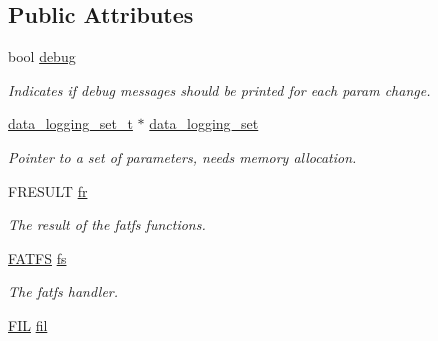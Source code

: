 \subsection*{Public Attributes}
\begin{DoxyCompactItemize}
\item 
\hypertarget{structdata__logging__t_ad68333fc2f6bf82222a007dc234d3634}{bool \hyperlink{structdata__logging__t_ad68333fc2f6bf82222a007dc234d3634}{debug}}\label{structdata__logging__t_ad68333fc2f6bf82222a007dc234d3634}

\begin{DoxyCompactList}\small\item\em Indicates if debug messages should be printed for each param change. \end{DoxyCompactList}\item 
\hypertarget{structdata__logging__t_a794f992659dd70d5a0ad314eba087c24}{\hyperlink{structdata__logging__set__t}{data\+\_\+logging\+\_\+set\+\_\+t} $\ast$ \hyperlink{structdata__logging__t_a794f992659dd70d5a0ad314eba087c24}{data\+\_\+logging\+\_\+set}}\label{structdata__logging__t_a794f992659dd70d5a0ad314eba087c24}

\begin{DoxyCompactList}\small\item\em Pointer to a set of parameters, needs memory allocation. \end{DoxyCompactList}\item 
\hypertarget{structdata__logging__t_a6248ef8191b138c0184bfee83fccc3b0}{F\+R\+E\+S\+U\+L\+T \hyperlink{structdata__logging__t_a6248ef8191b138c0184bfee83fccc3b0}{fr}}\label{structdata__logging__t_a6248ef8191b138c0184bfee83fccc3b0}

\begin{DoxyCompactList}\small\item\em The result of the fatfs functions. \end{DoxyCompactList}\item 
\hypertarget{structdata__logging__t_ae231554af0b74ed5a3719042775874de}{\hyperlink{structFATFS}{F\+A\+T\+F\+S} \hyperlink{structdata__logging__t_ae231554af0b74ed5a3719042775874de}{fs}}\label{structdata__logging__t_ae231554af0b74ed5a3719042775874de}

\begin{DoxyCompactList}\small\item\em The fatfs handler. \end{DoxyCompactList}\item 
\hypertarget{structdata__logging__t_ae3674d38429b86c46a964caf1a60fcb9}{\hyperlink{structFIL}{F\+I\+L} \hyperlink{structdata__logging__t_ae3674d38429b86c46a964caf1a60fcb9}{fil}}\label{structdata__logging__t_ae3674d38429b86c46a964caf1a60fcb9}


\end{DoxyCompactItemize}
